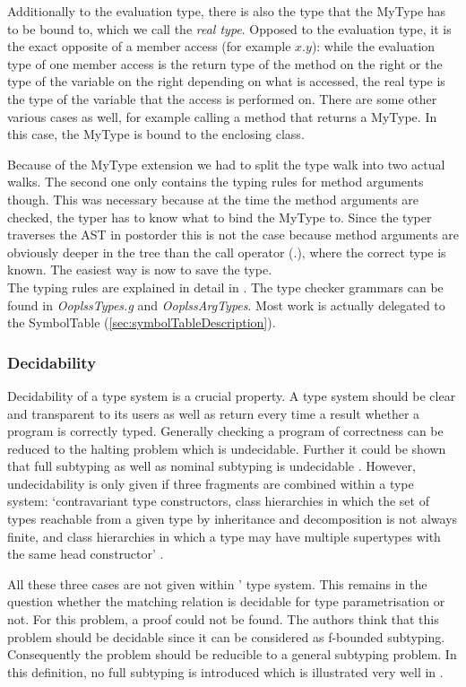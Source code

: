Additionally to the evaluation type, there is also the type that the
MyType has to be bound to, which we call the \emph{real type}. Opposed
to the evaluation type, it is the exact opposite of a member access
(for example $x.y$): while the evaluation type of one member access
is the return type of the method on the right or the type of the variable
on the right depending on what is accessed, the real type is the type
of the variable that the access is performed on. There are some other
various cases as well, for example calling a method that returns
a MyType. In this case, the MyType is bound to the enclosing class.


Because of the MyType extension we had to split the type walk into two
actual walks. The second one only contains the typing rules for method
arguments though. This was necessary because at the time the method
arguments are checked, the typer has to know what to bind the MyType
to. Since the typer traverses the AST in postorder this is not the case
because method arguments are obviously deeper in the tree than the
call operator (.), where the correct type is known. The easiest way
is now to save the type. \\

The typing rules are explained in detail in . The
type checker grammars can be found in \emph{OoplssTypes.g} and
\emph{OoplssArgTypes}. Most work is actually delegated to
the SymbolTable (\ref{sec:symbolTableDescription}).

\subsubsection{Decidability}
Decidability of a type system is a crucial property. A type system should
be clear and transparent to its users as well as return every time a
result whether a program is correctly typed. Generally checking a program
of correctness can be reduced to the halting problem which is undecidable.
Further it could be shown that full subtyping as well as nominal
subtyping is undecidable \cite{kennedy_decidability_2006}. However,
undecidability is only given if three fragments are combined within
a type system: `contravariant type constructors, class hierarchies in
which the set of types reachable from a given type by inheritance and
decomposition is not always finite, and class hierarchies in which
a type may have multiple supertypes with the same head constructor'
\cite{kennedy_decidability_2006}.

All these three cases are not given within \ooplss' type system. This
remains in the question whether the matching relation is decidable for
type parametrisation or not. For this problem, a proof could not be
found. The authors think that this problem should be decidable since
it can be considered as f-bounded subtyping. Consequently the
problem should be reducible to a general subtyping problem. In this
definition, no full subtyping is introduced which is illustrated very
well in \cite{pierce_types_2002}.

